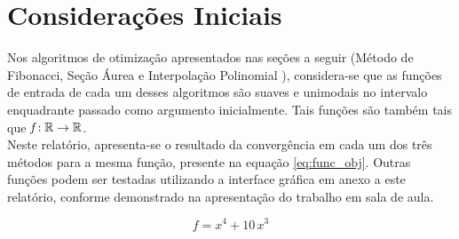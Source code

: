 \documentclass[a4paper,12pt,utf8x,notitlepage]{article}
\begin{document}
\setcounter{tocdepth}{3} 
\setcounter{secnumdepth}{3}

\begin{titlepage} 

\end{titlepage}

\fancyhead{}
\renewcommand{\footrulewidth}{0pt}
\renewcommand{\headrulewidth}{0.4pt}
\setcounter{page}{1}
\pagestyle{fancy}
\fancyfoot{}



\tableofcontents
\clearpage




\fancyhead{}
\setcounter{page}{1}
\renewcommand{\footrulewidth}{0pt}
\renewcommand{\headrulewidth}{0.4pt}
\fancyfoot[C]{\vfill \thepage}

\section{Considerações Iniciais}

\vspace{0.5cm}

Nos algoritmos de otimização apresentados nas seções a seguir (Método de Fibonacci, Seção Áurea e Interpolação Polinomial ), considera-se que as funções de entrada de cada um desses algoritmos são suaves e unimodais no intervalo enquadrante passado como argumento inicialmente. Tais funções são também tais que $\emph{f}:  \mathbb{R} \rightarrow  \mathbb{R}$.\\

Neste relatório, apresenta-se o resultado da convergência em cada um dos três métodos para a mesma função, presente na equação \ref{eq:func_obj}. Outras funções podem ser testadas utilizando a interface gráfica em anexo a este relatório, conforme demonstrado na apresentação do trabalho em sala de aula.

\begin{equation}
f = x^4 + 10 \, x^3
\label{eq:func_obj}
\end{equation}
\end{document}
